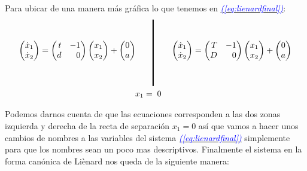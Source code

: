 \documentclass[12pt,a4paper]{report} %
\newcommand{\eref}[1]{\hyperref[#1]{\textcolor{blue}{\textit{(\ref*{#1})}}}}
\begin{document}
	Para ubicar de una manera más gráfica lo que tenemos en \eref{eq:lienardfinal}:
	\begin{equation}
		\label{eq:lienardfinalgr}
		\begin{aligned}
			\begin{pmatrix*}[r]
				\dot{x}_1\\ \dot{x}_2
			\end{pmatrix*}= \begin{pmatrix*}[r]
				t & -1 \\ d & 0
			\end{pmatrix*} \begin{pmatrix*}[r]
				x_1 \\ x_2
			\end{pmatrix*}+\begin{pmatrix*}[c]
				0 \\ a
			\end{pmatrix*} \qquad 
			&\rule[-40pt]{1.5pt}{80pt} \qquad 
			\begin{pmatrix*}[r]
				\dot{x}_1\\ \dot{x}_2
			\end{pmatrix*}= \begin{pmatrix*}[r]
				T & -1 \\ D & 0
			\end{pmatrix*} \begin{pmatrix*}[r]
				x_1 \\ x_2
			\end{pmatrix*}+\begin{pmatrix*}[c]
				0 \\ a
			\end{pmatrix*} \\ x_1=&\;\;0
		\end{aligned}
	\end{equation}\smallskip
	
	Podemos darnos cuenta de que las ecuaciones corresponden a las dos zonas izquierda y derecha de la recta de separación $x_1=0$ así que vamos a hacer unos cambios de nombres a las variables del sistema \eref{eq:lienardfinal} simplemente para que los nombres sean un poco mas descriptivos. Finalmente el sistema en la forma canónica de Liènard nos queda de la siguiente manera:
	
\end{document}
